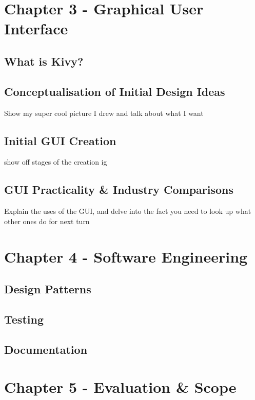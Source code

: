 \documentclass{article}
\begin{document}
\section{Chapter 3 - Graphical User Interface}

\subsection{What is Kivy?}

\subsection{Conceptualisation of Initial Design Ideas}
Show my super cool picture I drew and talk about what I want 
\subsection{Initial GUI Creation}
show off stages of the creation ig

\subsection{GUI Practicality \& Industry Comparisons}
Explain the uses of the GUI, and delve into the fact you need to look up what other ones do for next turn


\section{Chapter 4 - Software Engineering}

\subsection{Design Patterns}

\subsection{Testing}

\subsection{Documentation}


\section{Chapter 5 - Evaluation \& Scope}
\end{document}

